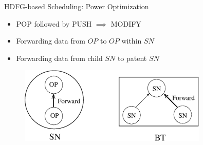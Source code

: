 \documentclass{beamer}
\begin{document}
\begin{CJK}{UTF8}{bkai}
            \begin{frame}{HDFG-based Scheduling: Power Optimization}
                \begin{itemize}
                    \item POP followed by PUSH $\implies$ MODIFY
                    \item Forwarding data from $OP$ to $OP$ within $SN$
                    \item Forwarding data from child $SN$ to patent $SN$
                \end{itemize}
                \begin{figure}[!ht] 
                    \centering
                    \includegraphics[width=0.8\textwidth]{./figs/power_opt}
                    \label{fig:archi}
                \end{figure}
            \end{frame}




\end{CJK}
\end{document}
